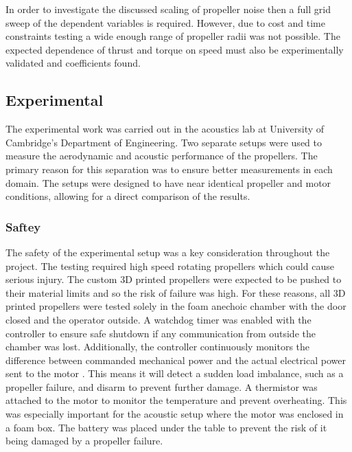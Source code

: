\documentclass[12pt,a4paper]{article}
\begin{document}
In order to investigate the discussed scaling of propeller noise then a full grid sweep of the dependent variables is required.
However, due to cost and time constraints testing a wide enough range of propeller radii was not possible.
The expected dependence of thrust and torque on speed must also be experimentally validated and coefficients found.

\subsection{Experimental}
The experimental work was carried out in the acoustics lab at University of Cambridge's Department of Engineering.
Two separate setups were used to measure the aerodynamic and acoustic performance of the propellers.
The primary reason for this separation was to ensure better measurements in each domain.
The setups were designed to have near identical propeller and motor conditions, allowing for a direct comparison of the results.

\subsubsection{Saftey}
The safety of the experimental setup was a key consideration throughout the project.
The testing required high speed rotating propellers which could cause serious injury.
The custom 3D printed propellers were expected to be pushed to their material limits and so the risk of failure was high.
For these reasons, all 3D printed propellers were tested solely in the foam anechoic chamber with the door closed and the operator outside.
A watchdog timer was enabled with the controller to ensure safe shutdown if any communication from outside the chamber was lost.
Additionally, the controller continuously monitors the difference between commanded mechanical power and the actual electrical power sent to the motor \cite{odrive_doc}.
This means it will detect a sudden load imbalance, such as a propeller failure, and disarm to prevent further damage.
A thermistor was attached to the motor to monitor the temperature and prevent overheating.
This was especially important for the acoustic setup where the motor was enclosed in a foam box.
The battery was placed under the table to prevent the risk of it being damaged by a propeller failure.
\end{document}
